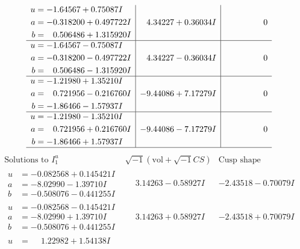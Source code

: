 \documentclass[1p]{elsarticle_modified}
\theoremstyle{definition}
\newcommand{\I}{\sqrt{-1}}
\begin{document}
$$\begin{array}{c|c|c}
\begin{aligned}
u &= -1.64567 + 0.75087 I \\
a &= -0.318200 + 0.497722 I \\
b &= \phantom{-}0.506486 + 1.315920 I\end{aligned}
 & \phantom{-}4.34227 + 0.36034 I & \phantom{-0.000000 } 0 \\ \hline\begin{aligned}
u &= -1.64567 - 0.75087 I \\
a &= -0.318200 - 0.497722 I \\
b &= \phantom{-}0.506486 - 1.315920 I\end{aligned}
 & \phantom{-}4.34227 - 0.36034 I & \phantom{-0.000000 } 0 \\ \hline\begin{aligned}
u &= -1.21980 + 1.35210 I \\
a &= \phantom{-}0.721956 - 0.216760 I \\
b &= -1.86466 - 1.57937 I\end{aligned}
 & -9.44086 + 7.17279 I & \phantom{-0.000000 } 0 \\ \hline\begin{aligned}
u &= -1.21980 - 1.35210 I \\
a &= \phantom{-}0.721956 + 0.216760 I \\
b &= -1.86466 + 1.57937 I\end{aligned}
 & -9.44086 - 7.17279 I & \phantom{-0.000000 } 0\\
 \hline 
 \end{array}$$\newpage$$\begin{array}{c|c|c}  
\text{Solutions to }I^u_{1}& \I (\text{vol} + \sqrt{-1}CS) & \text{Cusp shape}\\
 \hline 
\begin{aligned}
u &= -0.082568 + 0.145421 I \\
a &= -8.02990 - 1.39710 I \\
b &= -0.508076 - 0.441255 I\end{aligned}
 & \phantom{-}3.14263 - 0.58927 I & -2.43518 - 0.70079 I \\ \hline\begin{aligned}
u &= -0.082568 - 0.145421 I \\
a &= -8.02990 + 1.39710 I \\
b &= -0.508076 + 0.441255 I\end{aligned}
 & \phantom{-}3.14263 + 0.58927 I & -2.43518 + 0.70079 I \\ \hline\begin{aligned}
u &= \phantom{-}1.22982 + 1.54138 I \\

\end{aligned}
\end{array}$$
\end{document}
